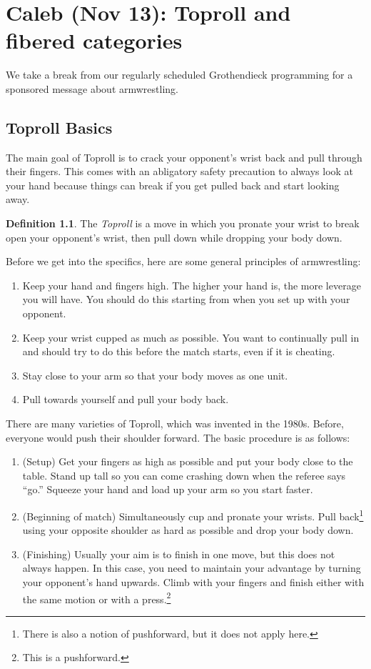\documentclass[leqno, openany]{memoir}
\theoremstyle{definition}
\newtheorem{defn}[thm]{Definition}
\theoremstyle{remark}
\theoremstyle{plain}
\theoremstyle{definition}
\theoremstyle{remark}
\begin{document}
\chapter{Caleb (Nov 13): Toproll and fibered categories}%
\label{cha:caleb_nov_13_toproll_and_fibered_categories}

We take a break from our regularly scheduled Grothendieck programming for a sponsored message about armwrestling.

\section{Toproll Basics}%
\label{sec:toproll_basics}

The main goal of Toproll is to crack your opponent's wrist back and pull through their fingers. This comes with an abligatory safety precaution to always look at your hand because things can break if you get pulled back and start looking away.

\begin{defn}
    The \textit{Toproll} is a move in which you pronate your wrist to break open your opponent's wrist, then pull down while dropping your body down. 
\end{defn}

Before we get into the specifics, here are some general principles of armwrestling:
\begin{enumerate}
    \item Keep your hand and fingers high. The higher your hand is, the more leverage you will have. You should do this starting from when you set up with your opponent.
    \item Keep your wrist cupped as much as possible. You want to continually pull in and should try to do this before the match starts, even if it is cheating.
    \item Stay close to your arm so that your body moves as one unit.
    \item Pull towards yourself and pull your body back.
\end{enumerate}

There are many varieties of Toproll, which was invented in the 1980s. Before, everyone would push their shoulder forward. The basic procedure is as follows:
\begin{enumerate}
    \item (Setup) Get your fingers as high as possible and put your body close to the table. Stand up tall so you can come crashing down when the referee says ``go.'' Squeeze your hand and load up your arm so you start faster.
    \item (Beginning of match) Simultaneously cup and pronate your wrists. Pull back\footnote{There is also a notion of pushforward, but it does not apply here.} using your opposite shoulder as hard as possible and drop your body down.
    \item (Finishing) Usually your aim is to finish in one move, but this does not always happen. In this case, you need to maintain your advantage by turning your opponent's hand upwards. Climb with your fingers and finish either with the same motion or with a press.\footnote{This is a pushforward.}
\end{enumerate}
\end{document}
